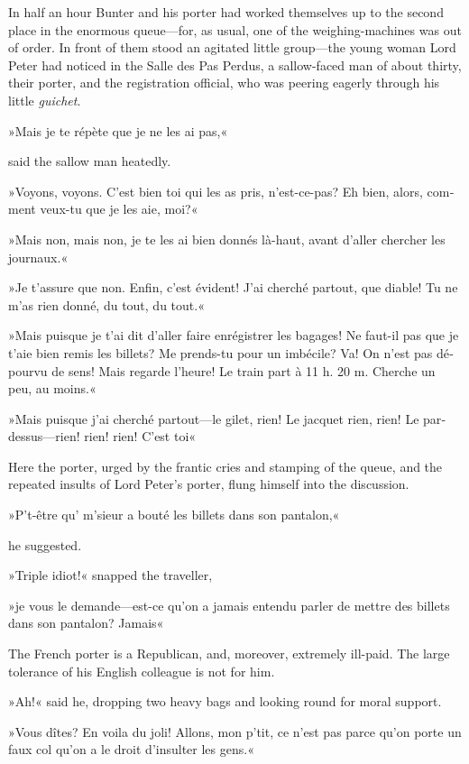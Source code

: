 In half an hour Bunter and his porter had worked themselves up to the second place in the enormous queue—for, as usual, one of the weighing-machines was out of order. In front of them stood an agitated little group—the young woman Lord Peter had noticed in the Salle des Pas Perdus, a sallow-faced man of about thirty, their porter, and the registration official, who was peering eagerly through his little \textit{guichet}.

\begin{french}»Mais je te répète que je ne les ai pas,« \end{french} said the sallow man heatedly. \begin{french}»Voyons, voyons. C'est bien toi qui les as pris, n'est-ce-pas? Eh bien, alors, comment veux-tu que je les aie, moi?«

»Mais non, mais non, je te les ai bien donnés là-haut, avant d'aller chercher les journaux.«

»Je t'assure que non. Enfin, c'est évident! J'ai cherché partout, que diable! Tu ne m'as rien donné, du tout, du tout.«

»Mais puisque je t'ai dit d'aller faire enrégistrer les bagages! Ne faut-il pas que je t'aie bien remis les billets? Me prends-tu pour un imbécile? Va! On n'est pas dépourvu de sens! Mais regarde l'heure! Le train part à 11 h. 20 m. Cherche un peu, au moins.«

»Mais puisque j'ai cherché partout—le gilet, rien! Le jacquet rien, rien! Le pardessus—rien! rien! rien! C'est toi\longdash«
\end{french}

Here the porter, urged by the frantic cries and stamping of the queue, and the repeated insults of Lord Peter's porter, flung himself into the discussion.
\begin{french}»P't-être qu' m'sieur a bouté les billets dans son pantalon,«\end{french} he suggested.

»Triple idiot!« snapped the traveller, \begin{french}»je vous le demande—est-ce qu'on a jamais entendu parler de mettre des billets dans son pantalon? Jamais\longdash«\end{french}

The French porter is a Republican, and, moreover, extremely ill-paid. The large tolerance of his English colleague is not for him.

»Ah!« said he, dropping two heavy bags and looking round for moral support. \begin{french}»Vous dîtes? En voila du joli! Allons, mon p'tit, ce n'est pas parce qu'on porte un faux col qu'on a le droit d'insulter les gens.«\end{french}

